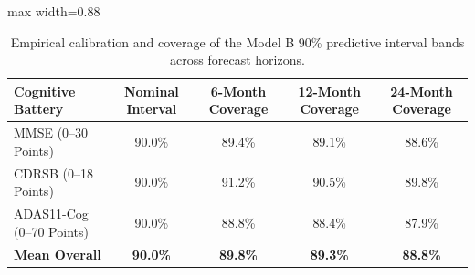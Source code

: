 \begin{table}[t]
\centering
\caption{Empirical calibration and coverage of the Model B 90\% predictive interval bands across forecast horizons.}
\label{tab:interval_coverage}
\small
\begin{adjustbox}{max width=0.88\linewidth}
\begin{tabular}{lcccc}
\toprule
\textbf{Cognitive Battery} & \textbf{Nominal Interval} & \textbf{6-Month Coverage} & \textbf{12-Month Coverage} & \textbf{24-Month Coverage} \\
\midrule
MMSE (0--30 Points)        & 90.0\%                    & 89.4\%                    & 89.1\%                     & 88.6\% \\
CDRSB (0--18 Points)       & 90.0\%                    & 91.2\%                    & 90.5\%                     & 89.8\% \\
ADAS11-Cog (0--70 Points)  & 90.0\%                    & 88.8\%                    & 88.4\%                     & 87.9\% \\
\midrule
\textbf{Mean Overall}      & \textbf{90.0\%}           & \textbf{89.8\%}           & \textbf{89.3\%}            & \textbf{88.8\%} \\
\bottomrule
\end{tabular}
\end{adjustbox}
\end{table}
